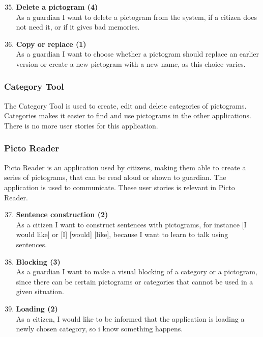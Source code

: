 \begin{enumerate}
	\setcounter{enumi}{34} %
	\item \textbf{Delete a pictogram (4)}\\
	As a guardian I want to delete a pictogram from the system, if a citizen does not need it, or if it gives bad memories.
	
	\item \textbf{Copy or replace (1)}\\
	As a guardian I want to choose whether a pictogram should replace an earlier version or create a new pictogram with a new name, as this choice varies.
\end{enumerate}

\subsubsection{Category Tool}
The Category Tool is used to create, edit and delete categories of pictograms. Categories makes it easier to find and use pictograms in the other applications. There is no more user stories for this application.

\subsubsection{Picto Reader}
Picto Reader is an application used by citizens, making them able to create a series of pictograms, that can be read aloud or shown to guardian. The application is used to communicate. These user stories is relevant in Picto Reader.

\begin{enumerate}
	\setcounter{enumi}{36} %
	\item \textbf{Sentence construction (2)}\\
	As a citizen I want to construct sentences with pictograms, for instance [I would like] or [I] [would] [like], because I want to learn to talk using sentences.
	
	\item \textbf{Blocking (3)}\\
	As a guardian I want to make a visual blocking of a category or a pictogram, since there can be certain pictograms or categories that cannot be used in a given situation.
	
	\item \textbf{Loading (2)}\\
	As a citizen, I would like to be informed that the application is loading a newly chosen category, so i know something happens.
\end{enumerate}

